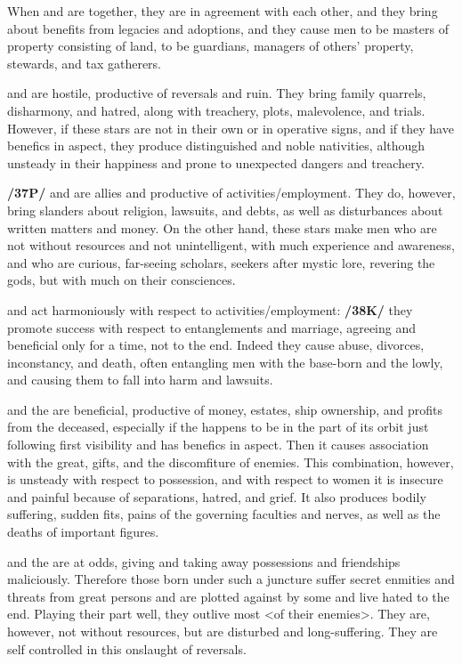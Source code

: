 When \Saturn\xspace and \Jupiter\xspace are together, they are in agreement with each other, and they bring about benefits from legacies and adoptions, and they cause men to be masters of property consisting of land, to be guardians, managers of others’ property, stewards, and tax gatherers.

\Saturn\xspace and \Mars\xspace are hostile, productive of reversals and ruin. They bring family quarrels, disharmony,
and hatred, along with treachery, plots, malevolence, and trials. However, if these stars are not in their own or in operative signs, and if they have benefics in aspect, they produce distinguished and noble nativities, although unsteady in their happiness and prone to unexpected dangers and treachery.

\textbf{/37P/}\Saturn\xspace and \Mercury\xspace are allies and productive of activities/employment. They do, however, bring slanders about religion, lawsuits, and debts, as well as disturbances about written matters and money. On the other hand, these stars make men who are not without resources and not unintelligent, with much experience and awareness, and who are curious, far-seeing scholars, seekers after mystic lore,
revering the gods, but with much on their consciences.

\Saturn\xspace and \Venus\xspace act harmoniously with respect to activities/employment: \textbf{/38K/} they promote success with respect to entanglements and marriage, agreeing and beneficial only for a time, not to the end. Indeed they cause abuse, divorces, inconstancy, and death, often entangling men with the base-born and the lowly, and causing them to fall into harm and lawsuits.

\Saturn\xspace and the \Moon\xspace are beneficial, productive of money, estates, ship ownership, and profits from the deceased, \mndl especially if the \Moon\xspace happens to be in the part of its orbit just following first visibility and has benefics in aspect. Then it causes association with the great, gifts, and the discomfiture of enemies. This combination, however, is unsteady with respect to possession, and with respect to women it is insecure and painful because of separations, hatred, and grief. It also produces bodily suffering, sudden fits, pains of
the governing faculties and nerves, as well as the deaths of important figures.

\Saturn\xspace and the \Sun\xspace are at odds, giving and taking away possessions and friendships maliciously. Therefore those born under such a juncture suffer secret enmities and threats from great persons and are plotted against by some and live hated to the end. Playing their part well, they outlive most <of their enemies>. They are, however, not without resources, but are disturbed and long-suffering. They are self controlled in this onslaught of reversals.

